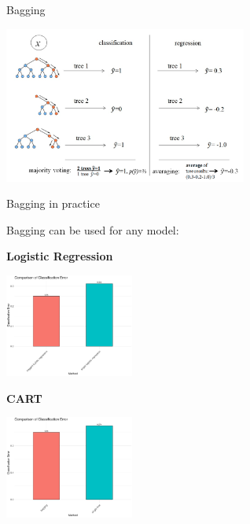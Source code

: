 \documentclass[11pt,compress,t,notes=noshow, xcolor=table]{beamer}
\begin{document}
\begin{vbframe}{Bagging}
\begin{center}
\includegraphics[width=0.6\textwidth]{figure_man/rf_majvot_averaging.png}
\end{center}
\end{vbframe}


\begin{vbframe}{Bagging in practice}

Bagging can be used for any model:

\vspace{2em}

\begin{minipage}{0.4\textwidth}
\begin{center}
\textbf{Logistic Regression}
\end{center}

\includegraphics[width=120pt]{figure/bagging-bench_log.jpg}
\end{minipage}
\begin{minipage}{0.4\textwidth}
\begin{center}
\textbf{CART}
\end{center}

\includegraphics[width=120pt]{figure/bagging-bench_tree.jpg}
\end{minipage}

\end{vbframe}
\end{document}
